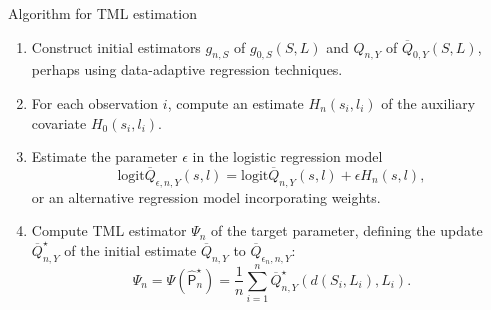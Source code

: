 \documentclass{beamer}
\begin{document}
\begin{frame}[c]{Algorithm for TML estimation}

\begin{center}
\begin{enumerate}\label{tmle_algo}
  \itemsep6pt
  \item Construct initial estimators $g_{n,S}$ of $g_{0,S}(S, L)$ and $Q_{n,Y}$
    of $\overline{Q}_{0,Y}(S, L)$, perhaps using data-adaptive regression
    techniques.
  \item For each observation $i$, compute an estimate $H_n(s_i, l_i)$ of the
    auxiliary covariate $H_0(s_i, l_i)$.
  \item Estimate the parameter $\epsilon$ in the logistic regression model
    $$\text{logit}\overline{Q}_{\epsilon, n, Y}(s, l) =
    \text{logit}\overline{Q}_{n,Y}(s, l) + \epsilon H_n(s, l),$$
    or an alternative regression model incorporating weights.
  \item Compute TML estimator $\Psi_n$ of the target parameter, defining the
    update $\overline{Q}_{n,Y}^{\star}$ of the initial estimate
    $\overline{Q}_{n,Y}$ to $\overline{Q}_{\epsilon_n, n, Y}$:
    \begin{equation*}\label{tmle}
      \Psi_n = \Psi(\hat{\mathsf{P}}_n^{\star}) = \frac{1}{n} \sum_{i = 1}^n
        \overline{Q}_{n,Y}^{\star}(d(S_i, L_i), L_i).
      \end{equation*}
\end{enumerate}
\end{center}


\end{frame}

\end{document}
